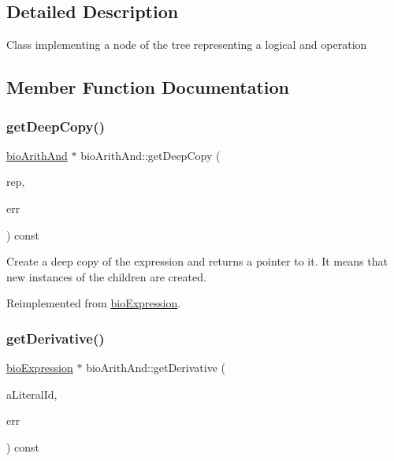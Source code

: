 \subsection{Detailed Description}
Class implementing a node of the tree representing a logical and operation 

\subsection{Member Function Documentation}
\mbox{\label{classbio_arith_and_aa60d3a4e8d9b4684e584991a2b1effe2}} 
\subsubsection{\texorpdfstring{get\+Deep\+Copy()}{getDeepCopy()}}
{\footnotesize\ttfamily \hyperlink{classbio_arith_and}{bio\+Arith\+And} $\ast$ bio\+Arith\+And\+::get\+Deep\+Copy (\begin{DoxyParamCaption}\item[{\hyperlink{classbio_expression_repository}{bio\+Expression\+Repository} $\ast$}]{rep,  }\item[{pat\+Error $\ast$\&}]{err }\end{DoxyParamCaption}) const\hspace{0.3cm}{\ttfamily [virtual]}}

Create a deep copy of the expression and returns a pointer to it. It means that new instances of the children are created. 

Reimplemented from \hyperlink{classbio_expression_a4ee1b8add634078a02eaae26cd40dcc8}{bio\+Expression}.

\mbox{\label{classbio_arith_and_a78f633a87efd5a6cbf2130032ec7100c}} 
\subsubsection{\texorpdfstring{get\+Derivative()}{getDerivative()}}
{\footnotesize\ttfamily \hyperlink{classbio_expression}{bio\+Expression} $\ast$ bio\+Arith\+And\+::get\+Derivative (\begin{DoxyParamCaption}\item[{pat\+U\+Long}]{a\+Literal\+Id,  }\item[{pat\+Error $\ast$\&}]{err }\end{DoxyParamCaption}) const\hspace{0.3cm}{\ttfamily [virtual]}}

